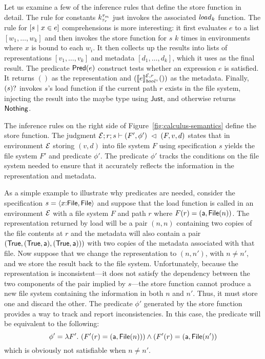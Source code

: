 Let us examine a few of the inference rules that define the store
function in detail. The rule for constants $\Sk$ just invokes the
associated $\loadkname{k}$ function. The rule for
$\SComp{s}{x}{e}$ comprehensions is more interesting: it first
evaluates $e$ to a list $[w_1,\dots,w_k]$ and then invokes the store
function for $s$ $k$ times in environments where $x$ is bound to each
$w_i$. It then collects up the results into lists of representations
$[v_1,\dots,v_k]$ and metadata $[d_1,\dots,d_k]$, which it uses as the
final result. The predicate $\SPred{e}$ construct tests whether an
expression $e$ is satisfied. It returns $()$ as the representation and
$(\eval{e}{\Env,r}{\mathit{bool}},())$ as the metadata. Finally,
$\SOption{s}$ invokes $s$'s load function if the current path $r$
exists in the file system, injecting the result into the maybe type
using $\mathsf{Just}$, and otherwise returns $\Nothing$.

The inference rules on the right side of
Figure~\ref{fig:calculus-semantics} define the store function. The
judgment $\store{\Env}{F}{r}{v,d}{s}{F',\phi'}$ states that in
environment $\Env$ storing $(v,d)$ into file system $F$ using
specification $s$ yields the file system $F'$ and predicate
$\phi'$. The predicate $\phi'$ tracks the conditions on the file
system needed to ensure that it accurately reflects the information in
the representation and metadata.

As a simple example to illustrate why predicates are needed, consider
the specification $s = \SPair{x}{\pfile}{\pfile}$ and suppose that the
load function is called in an environment $\Env$ with a file system
$F$ and path $r$ where $F(r) = (\att,\File{n})$. The representation
returned by load will be a pair $(n,n)$ containing two copies of the
file contents at $r$ and the metadata will also contain a pair
$(\True,(\True,\att),(\True,\att)))$ with two copies of the metadata
associated with that file. Now suppose that we change the
representation to $(n,n')$, with $n \neq n'$, and we store the result
back to the file system. Unfortunately, because the representation is
inconsistent---it does not satisfy the dependency between the two
components of the pair implied by $s$---the store function cannot
produce a new file system containing the information in both $n$ and
$n'$. Thus, it must store one and discard the other.  The predicate
$\phi'$ generated by the store function provides a way to track and
report inconsistencies. In this case, the predicate will be equivalent
to the following:
%
\[
\phi' = \lambda F'.~ (F'(r) = (\att,\File{n})) \wedge (F'(r) = (\att,\File{n'})
\]
%
which is obviously not satisfiable when $n \not= n'$. 

